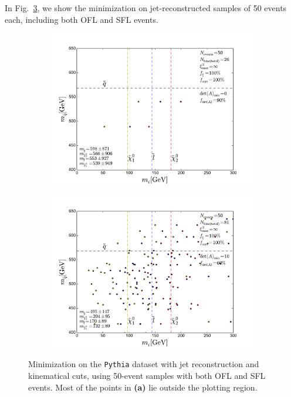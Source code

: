 \documentclass[twoside,english]{uiofysmaster}
\begin{document}
In Fig.\ \ref{fig:event-pair-A-selection_pythia_4combosum-jetrec-OSFL-50events}, we show the minimization on jet-reconstructed samples of 50 events each, including both OFL and SFL events. 
\begin{figure}[hbtp!]
	\centering
	\begin{subfigure}[b]{0.45\textwidth}
		\includegraphics[width=\textwidth]{figures/improving_combinatorics/pythia_jetrec_50evbins_nodetAcut-nosmear_TMP.pdf} 
		\caption{ }
		\label{fig:event-pair-A-selection_pythia_4combosum-jetrec-OSFL-50events_a}
	\end{subfigure}
	\begin{subfigure}[b]{0.45\textwidth}
		\includegraphics[width=\textwidth]{figures/improving_combinatorics/pythia_jetrec_50evbins_detAcut10-nosmear_TMP.pdf}
		\caption{ }
		\label{fig:event-pair-A-selection_pythia_4combosum-jetrec-OSFL-50events_b} 
	\end{subfigure}
	\caption{Minimization on the {\tt Pythia} dataset with jet reconstruction and kinematical cuts, using 50-event samples with both OFL and SFL events. Most of the points in {\bf (a)} lie outside the plotting region.}
	\label{fig:event-pair-A-selection_pythia_4combosum-jetrec-OSFL-50events}
\end{figure}
\end{document}
